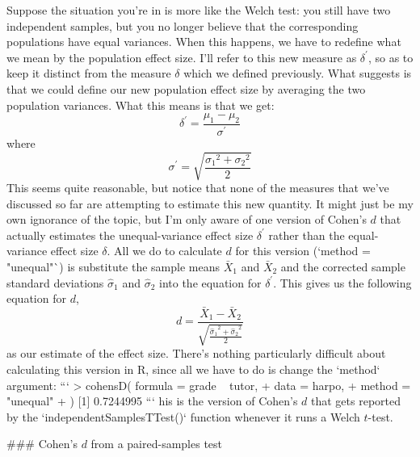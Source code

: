 Suppose the situation you're in is more like the Welch test: you still have two independent samples, but you no longer believe that the corresponding populations have equal variances. When this happens, we have to redefine what we mean by the population effect size. I'll refer to this new measure as $\delta^\prime$, so as to keep it distinct from the measure $\delta$ which we defined previously. What  suggests is that we could define our new population effect size by averaging the two population variances. What this means is that we get:
$$
\delta^\prime = \frac{\mu_1 - \mu_2}{\sigma^\prime}
$$
where 
$$
\sigma^\prime = \sqrt{\displaystyle{\frac{ {\sigma_1}^2 + {\sigma_2}^2}{2}}}
$$
This seems quite reasonable, but notice that none of the measures that we've discussed so far are attempting to estimate this new quantity. It might just be my own ignorance of the topic, but I'm only aware of one version of Cohen's $d$ that actually estimates the unequal-variance effect size $\delta^\prime$ rather than the equal-variance effect size $\delta$.
All we do to calculate $d$ for this version (`method = "unequal"`) is substitute the sample means $\bar{X}_1$ and $\bar{X}_2$ and the corrected sample standard deviations $\hat{\sigma}_1$ and $\hat{\sigma}_2$ into the equation for $\delta^\prime$. This gives us the following equation for $d$, 
$$
d = \frac{\bar{X}_1 - \bar{X}_2}{\sqrt{\displaystyle{\frac{ {\hat\sigma_1}^2 + {\hat\sigma_2}^2}{2}}}}
$$
as our estimate of the effect size. There's nothing particularly difficult about calculating this version in R, since all we have to do is change the `method` argument:
```
> cohensD( formula = grade ~ tutor, 
+          data = harpo,
+          method = "unequal" 
+ )
[1] 0.7244995
```
his is the version of Cohen's $d$ that gets reported by the `independentSamplesTTest()` function whenever it runs a Welch $t$-test.




### Cohen's $d$ from a paired-samples test


